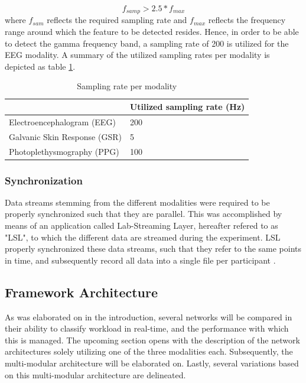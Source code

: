 \documentclass[12pt]{article}
\begin{document}
\begin{equation}
\label{eqn:nyquist}
f_{samp} > 2.5 * f_{max}
\end{equation}
where $f_{sam}$ reflects the required sampling rate and $f_{max}$ reflects the frequency range around which the feature to be detected resides\cite{srinivasan1998estimating}. Hence, in order to be able to detect the gamma frequency band, a sampling rate of 200 is utilized for the EEG modality. A summary of the utilized sampling rates per modality is depicted as table \ref{table:samplingrate}.

\bgroup
\def\arraystretch{1.6}%
\begin{table}[h]
\centering
\caption{Sampling rate per modality}
\label{table:samplingrate}
\begin{tabular}{ll}
    & Utilized sampling rate (Hz) \\ \hline
 Electroencephalogram (EEG) & 200                         \\
Galvanic Skin Response (GSR) & 5                           \\
Photoplethysmography (PPG) & 100                         \\ \hline
\end{tabular}
\end{table}
\egroup

\subsubsection{Synchronization}
Data streams stemming from the different modalities were required to be properly synchronized such that they are parallel. This was accomplished by means of an application called Lab-Streaming Layer, hereafter refered to as "LSL", to which the different data are streamed during the experiment. LSL properly synchronized these data streams, such that they refer to the same points in time, and subsequently record all data into a single file per participant \cite{kothe2018lab}.

\subsection{Framework Architecture}
As was elaborated on in the introduction, several networks will be compared in their ability to classify workload in real-time, and the performance with which this is managed. The upcoming section opens with the description of the network architectures solely utilizing one of the three modalities each. Subsequently, the multi-modular architecture will be elaborated on. Lastly, several variations based on this multi-modular architecture are delineated. 
\end{document}
